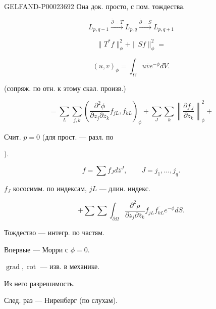 \begin{GelfandAdjacentEvidence}{GELFAND-P000236}{92}
Она док. просто, с пом. тождества.



\begin{equation*}
 L_{p,q-1}\overset{\bar\partial=T}{\longrightarrow}L_{p,q}
 \overset{\bar\partial=S}{\longrightarrow}L_{p,q+1}
\end{equation*}



\begin{equation*}
 \|T^*f\|_\phi^2+\|Sf\|_\phi^2=
\end{equation*}



\begin{equation*}
 (u,v)_\phi=\int_\Omega u\bar v e^{-\phi}dV.
\end{equation*}



(сопряж. по отн. к этому скал. произв.)



\begin{equation*}
 =\sum_L\sum_{j,k}\left(\frac{\partial^2\phi}{\partial z_j\partial\bar z_k}f_{jL},f_{kL}\right)_\phi
 +\sum_J\sum_k\left\|\frac{\partial f_J}{\partial\bar z_k}\right\|_\phi^2+
\end{equation*}




Счит. $p=0$ (для прост. — разл. по 

).

\begin{equation*}
 f=\sum f_Jd\bar z^J,\qquad J=j_1,\ldots,j_q.
\end{equation*}



$f_J$ кососимм. по индексам, $jL$ — длин. индекс.



\begin{equation*}
 +\sum\sum\int_{\partial\Omega}\frac{\partial^2\rho}{\partial z_j\partial\bar z_k}f_{jL}\overline{f_{kL}}e^{-\phi}dS.
\end{equation*}



Тождество — интегр. по частям.



Впервые — Морри с $\phi=0$.



$\operatorname{grad},\operatorname{rot}$ — изв. в механике.



Из него разрешимость.



След. раз — Ниренберг (по слухам).




\end{GelfandAdjacentEvidence}


